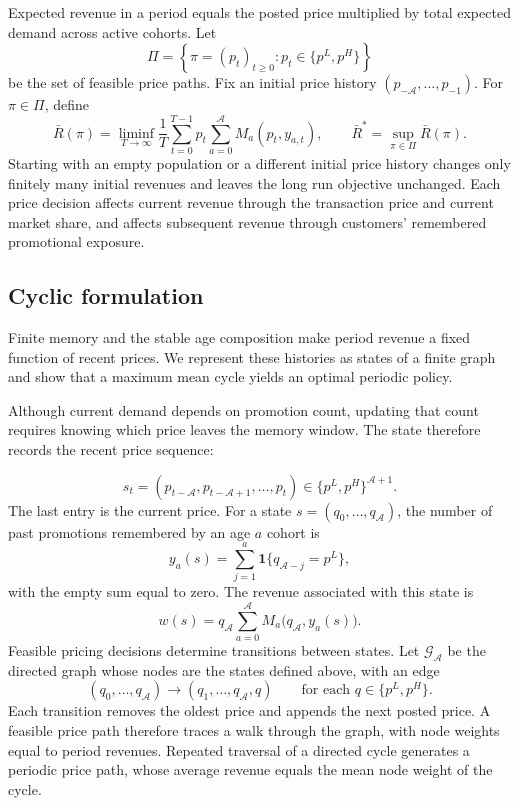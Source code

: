 Expected revenue in a period equals the posted price multiplied by total expected demand across active cohorts. Let
\[
    \Pi=\left\{\pi=(p_t)_{t\geq0}:p_t\in\{p^L,p^H\}\right\}
\]
be the set of feasible price paths. Fix an initial price history \((p_{-\mathcal A},\ldots,p_{-1})\). For \(\pi\in\Pi\), define
\[
    \bar R(\pi)
    =
    \liminf_{T\to\infty}
    \frac{1}{T}
    \sum_{t=0}^{T-1}
    p_t\sum_{a=0}^{\mathcal A}M_a(p_t,y_{a,t}),
    \qquad
    \bar R^*=\sup_{\pi\in\Pi}\bar R(\pi).
\]
Starting with an empty population or a different initial price history changes only finitely many initial revenues and leaves the long run objective unchanged. Each price decision affects current revenue through the transaction price and current market share, and affects subsequent revenue through customers' remembered promotional exposure.

\subsection{Cyclic formulation}
\label{sec:cycle}

\begingroup\color{black}
Finite memory and the stable age composition make period revenue a fixed function of recent prices. We represent these histories as states of a finite graph and show that a maximum mean cycle yields an optimal periodic policy.

Although current demand depends on promotion count, updating that count requires knowing which price leaves the memory window. The state therefore records the recent price sequence:
\par\endgroup
\[
    s_t=(p_{t-\mathcal A},p_{t-\mathcal A+1},\ldots,p_t)
    \in\{p^L,p^H\}^{\mathcal A+1}.
\]
The last entry is the current price. For a state \(s=(q_0,\ldots,q_{\mathcal A})\), the number of past promotions remembered by an age \(a\) cohort is
\[
    y_a(s)=\sum_{j=1}^{a}\mathbf 1\{q_{\mathcal A-j}=p^L\},
\]
with the empty sum equal to zero. The revenue associated with this state is
\[
    w(s)=q_{\mathcal A}\sum_{a=0}^{\mathcal A}
    M_a\bigl(q_{\mathcal A},y_a(s)\bigr).
\]
Feasible pricing decisions determine transitions between states. Let \(\mathcal G_{\mathcal A}\) be the directed graph whose nodes are the states defined above, with an edge
\[
    (q_0,\ldots,q_{\mathcal A})
    \longrightarrow(q_1,\ldots,q_{\mathcal A},q)
    \qquad\text{for each }q\in\{p^L,p^H\}.
\]
Each transition removes the oldest price and appends the next posted price. A feasible price path therefore traces a walk through the graph, with node weights equal to period revenues. Repeated traversal of a directed cycle generates a periodic price path, whose average revenue equals the mean node weight of the cycle.

